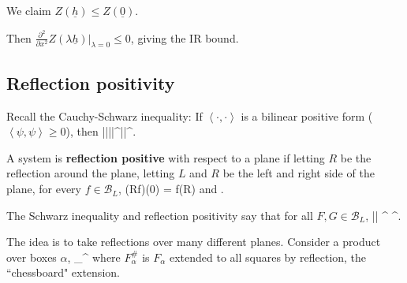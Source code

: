 \documentclass[12pt]{book}
\theoremstyle{norm}
\begin{document}
We claim $Z(\underline{h}) \le Z(\underline{0})$.

Then $\frac{\partial^2 }{\partial {x}^2} Z(\lambda \underline{h})|_{\lambda=0} \le 0$, giving the IR bound.

\subsection{Reflection positivity}
Recall the Cauchy-Schwarz inequality: If $\left\langle {\cdot, \cdot}\right\rangle$ is a bilinear positive form ($\left\langle {\psi,\psi}\right\rangle\ge 0$), then
\be
|\left\langle {\psi,\varphi}\right\rangle|\le |\left\langle {\psi|\psi}\right\rangle|^{}|\left\langle {\varphi,\varphi}\right\rangle|^{}.
\ee

\begin{definition}
A system is \textbf{reflection positive} with respect to a plane if letting $R$ be the reflection around the plane, letting $L$ and $R$ be the left and right side of the plane, for every $f\in \mathcal{B}_L$,
\be
(Rf)(0) = f(R\sigma)
\ee
and
\be
\left{}\right\rangle{}.
\ee
\end{definition}
The Schwarz inequality and reflection positivity say that for all $F,G\in \mathcal{B}_L$, 
\be
|\left{}\right\rangle| \le \left{}\right\rangle^{} \cdots \left{}\right\rangle^{}.
\ee

The idea is to take reflections over many different planes. Consider a product over boxes $\alpha$,
\be
\left{}\right\rangle \le \prod_\alpha\left{}\right\rangle^{}
\ee
where $F_\alpha^{\#}$ is $F_\alpha$ extended to all squares by reflection, the ``chessboard" extension. %


%

%
%

\printnomenclature
\printindex
\end{document}
